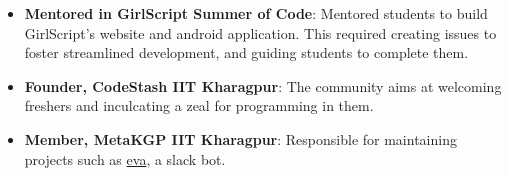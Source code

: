\documentclass[a4paper,10pt]{extarticle} %
\begin{document}
\begin{itemize}[leftmargin=0.55cm, rightmargin=0.2cm, label={\Large\textbullet}]
\item \textbf{Mentored in GirlScript Summer of Code}: Mentored students to build GirlScript's website and android application. This required creating issues to foster streamlined development, and guiding students to complete them.
\item \textbf{Founder, CodeStash IIT Kharagpur}: The community aims at welcoming freshers and inculcating a zeal for programming in them.
\item \textbf{Member, MetaKGP IIT Kharagpur}: Responsible for maintaining projects such as \href{https://www.github.com/thealphadollar/eva}{eva}, a slack bot.
\end{itemize}




\end{document}
